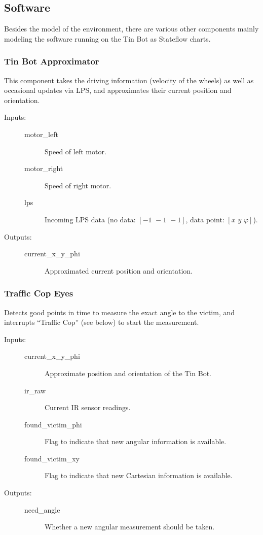 \documentclass[a4paper,parskip,headheight=38pt]{scrartcl} %
\begin{document}
\subsection{Software}
Besides the model of the environment, there are various other components mainly modeling the software running on the Tin Bot as Stateflow charts.

\subsubsection{Tin Bot Approximator}

This component takes the driving information (velocity of the wheels) as well as occasional updates via LPS, and approximates their current position and orientation.

\begin{description}
\item[Inputs:] \hfill
	\begin{description}
	\item[motor\_left] Speed of left motor.
	\item[motor\_right] Speed of right motor.
	\item[lps] Incoming LPS data (no data: $[-1\,\, -1\,\, -1]$, data point: $[x\,\, y\,\, \varphi]$).
	\end{description}
\item[Outputs:] \hfill
	\begin{description}
	\item[current\_x\_y\_phi] Approximated current position and orientation.
	\end{description}
\end{description}

\subsubsection{Traffic Cop Eyes}

Detects good points in time to measure the exact angle to the victim,
and interrupts \enquote{Traffic Cop} (see below) to start the
measurement.

\begin{description}
\item[Inputs:] \hfill
	\begin{description}
	\item[current\_x\_y\_phi] Approximate position and orientation of the Tin Bot. 
	\item[ir\_raw] Current IR sensor readings.
	\item[found\_victim\_phi] Flag to indicate that new angular information is available.
	\item[found\_victim\_xy] Flag to indicate that new Cartesian information is available.
	\end{description}
\item[Outputs:] \hfill
	\begin{description}
	\item[need\_angle] Whether a new angular measurement should be taken.
	\end{description}
\end{description}
\end{document}
